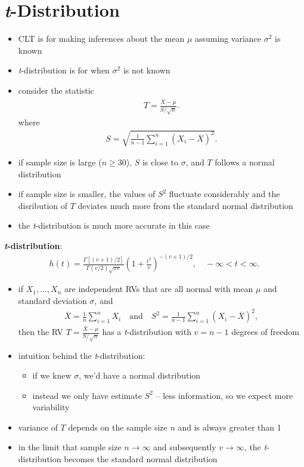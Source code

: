 \documentclass[10pt]{article}
\begin{document}
\section{\textit{t}-Distribution}
\begin{itemize}
    \item CLT is for making inferences about the mean $\mu$ assuming variance $\sigma^2$ is known
    \item \textit{t}-distribution is for when $\sigma^2$ is not known
    \item consider the statistic 
        \begin{gather*}
            T = \frac{\overline{X}-\mu}{S / \sqrt{n} }
        .\end{gather*}
        where
        \begin{gather*}
            S = \sqrt{\frac{1}{n-1}\sum_{i=1}^{n} (X_i-\overline{X})^2} 
        .\end{gather*}
    \item if sample size is large ($n \ge 30$), $S$ is close to $\sigma$, and $T$ follows a normal distribution
    \item if sample size is smaller, the values of $S^2$ fluctuate considerably and the disribution of $T$ deviates much more from the standard normal distribution
    \item the \textit{t}-distribution is much more accurate in this case
\end{itemize}
\begin{definition}
    \textbf{\textit{t}-distribution}:
    \begin{gather*}
        h(t) = \frac{\Gamma [(v+1) / 2]}{\Gamma (v / 2) \sqrt{\pi v}} \left( 1 + \frac{t^2}{v} \right)^{-(v+1) / 2} , \quad -\infty < t < \infty
    .\end{gather*}
\end{definition}
\begin{itemize}
    \item if $X_1, \ldots, X_n$ are independent RVs that are all normal with mean $\mu$ and standard deviation $\sigma$, and 
        \begin{gather*}
            \overline{X} = \frac{1}{n}\sum_{i=1}^{n} X_i \quad \text{and} \quad S^2 = \frac{1}{n-1}\sum_{i=1}^{n} (X_i-\overline{X})^2
        ,\end{gather*}
        then the RV $T = \frac{\overline{X}-\mu}{S / \sqrt{n} }$ has a \textit{t}-distribution with $v=n-1$ degrees of freedom
    \item intuition behind the \textit{t}-distribution: 
        \begin{itemize}
            \item if we knew $\sigma$, we'd have a normal distribution
            \item instead we only have estimate $S^2$ -- less information, so we expect more variability
        \end{itemize}
    \item variance of $T$ depends on the sample size $n$ and is always greater than 1 
    \item in the limit that sample size $n \to \infty$ and subsequently $v \to \infty$, the \textit{t}-distribution becomes the standard normal distribution
\end{itemize}
\end{document}
